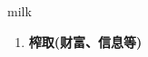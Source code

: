 
\begin{frame}
{\huge milk}
\begin{center}
\begin{enumerate}\Large
  \item \textbf{榨取(财富、信息等)}
\end{enumerate}
\end{center}
\end{frame}
